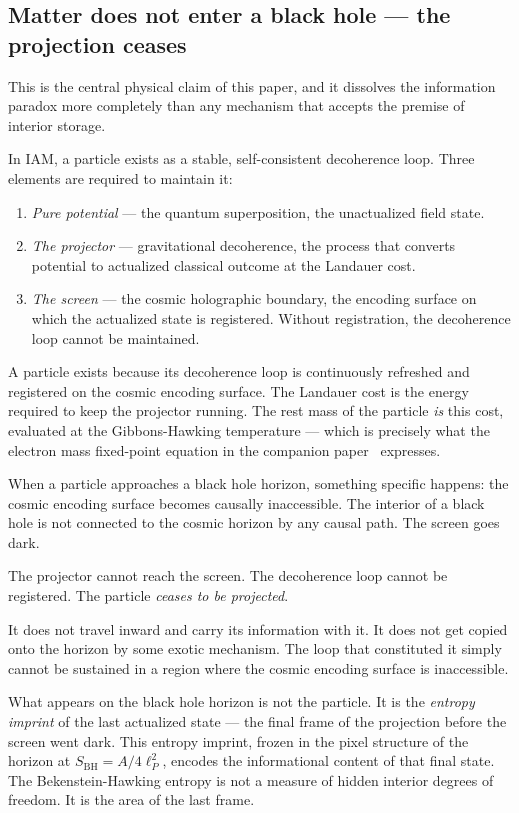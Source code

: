 \documentclass[12pt,letterpaper]{article}
\begin{document}
\subsection{Matter does not enter a black hole --- the projection ceases}

This is the central physical claim of this paper, and it
dissolves the information paradox more completely than any
mechanism that accepts the premise of interior storage.

In IAM, a particle exists as a stable, self-consistent
decoherence loop. Three elements are required to maintain it:

\begin{enumerate}
\item \emph{Pure potential} --- the quantum superposition,
  the unactualized field state.
\item \emph{The projector} --- gravitational decoherence,
  the process that converts potential to actualized classical
  outcome at the Landauer cost.
\item \emph{The screen} --- the cosmic holographic boundary,
  the encoding surface on which the actualized state is
  registered. Without registration, the decoherence loop
  cannot be maintained.
\end{enumerate}

A particle exists because its decoherence loop is continuously
refreshed and registered on the cosmic encoding surface.
The Landauer cost is the energy required to keep the projector
running. The rest mass of the particle \emph{is} this cost,
evaluated at the Gibbons-Hawking temperature --- which is
precisely what the electron mass fixed-point equation in the
companion paper~\cite{MahaffeyParticle2026} expresses.

When a particle approaches a black hole horizon, something
specific happens: the cosmic encoding surface becomes causally
inaccessible. The interior of a black hole is not connected
to the cosmic horizon by any causal path. The screen goes dark.

The projector cannot reach the screen.
The decoherence loop cannot be registered.
The particle \emph{ceases to be projected}.

It does not travel inward and carry its information with it.
It does not get copied onto the horizon by some exotic mechanism.
The loop that constituted it simply cannot be sustained in a
region where the cosmic encoding surface is inaccessible.

What appears on the black hole horizon is not the particle.
It is the \emph{entropy imprint} of the last actualized state ---
the final frame of the projection before the screen went dark.
This entropy imprint, frozen in the pixel structure of the
horizon at $S_\text{BH} = A/4\ell_P^2$, encodes the
informational content of that final state.
The Bekenstein-Hawking entropy is not a measure of hidden
interior degrees of freedom. It is the area of the last frame.
\end{document}
